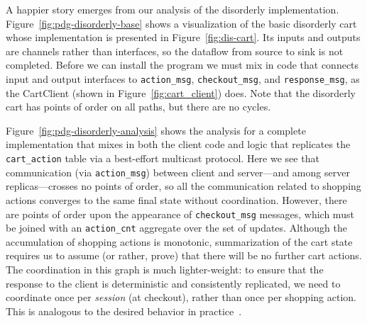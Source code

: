 A happier story emerges from our analysis of the disorderly implementation.
Figure~\ref{fig:pdg-disorderly-base} shows a visualization of the basic
disorderly cart whose implementation is presented in Figure~\ref{fig:dis-cart}.
Its inputs and outputs are channels rather than interfaces, so the dataflow from
source to sink is not completed.  Before we can install the program we must mix
in code that connects input and output interfaces to \texttt{action\_msg},
\texttt{checkout\_msg}, and \texttt{response\_msg}, as the CartClient (shown in
Figure~\ref{fig:cart_client}) does.  Note that the disorderly cart has points of
order on all paths, but there are no cycles.

Figure~\ref{fig:pdg-disorderly-analysis} shows the analysis for a complete implementation that mixes in 
both the client code and logic that replicates the \texttt{cart\_action} table via a
best-effort multicast protocol.
Here we see that communication (via \texttt{action\_msg}) between client and
server---and among server replicas---crosses no points of order, so all the
communication related to shopping actions converges to the same final state without coordination.
However, there are points of order upon the appearance of \texttt{checkout\_msg}
messages, which must be joined with an \texttt{action\_cnt} aggregate over the set of updates.  Although the 
accumulation of shopping actions is monotonic, summarization of the cart state
requires us to assume (or rather, prove) that there will be no further cart actions.
The coordination in this graph is much lighter-weight: to
ensure that the response to the client is deterministic and consistently replicated, we need to coordinate once per {\em session} (at checkout), rather than once per shopping action.  This is analogous to the desired behavior in practice~\cite{quicksand}.
%

